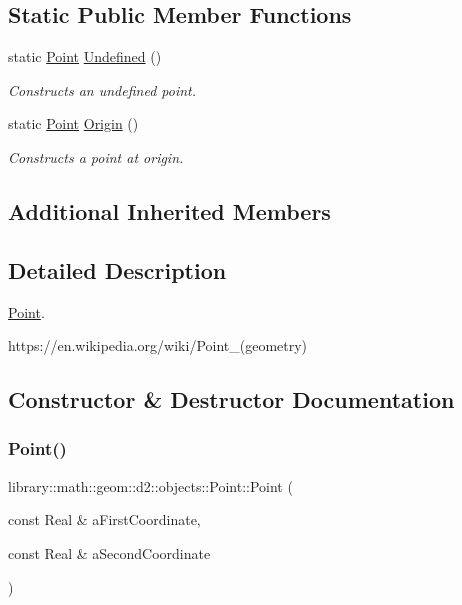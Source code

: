 \subsection*{Static Public Member Functions}
\begin{DoxyCompactItemize}
\item 
static \hyperlink{classlibrary_1_1math_1_1geom_1_1d2_1_1objects_1_1_point}{Point} \hyperlink{classlibrary_1_1math_1_1geom_1_1d2_1_1objects_1_1_point_a110a5bba9399abc5408f6c34306040c6}{Undefined} ()
\begin{DoxyCompactList}\small\item\em Constructs an undefined point. \end{DoxyCompactList}\item 
static \hyperlink{classlibrary_1_1math_1_1geom_1_1d2_1_1objects_1_1_point}{Point} \hyperlink{classlibrary_1_1math_1_1geom_1_1d2_1_1objects_1_1_point_ac372ec5b87ab91d58dc515eda2f0fa75}{Origin} ()
\begin{DoxyCompactList}\small\item\em Constructs a point at origin. \end{DoxyCompactList}\end{DoxyCompactItemize}
\subsection*{Additional Inherited Members}


\subsection{Detailed Description}
\hyperlink{classlibrary_1_1math_1_1geom_1_1d2_1_1objects_1_1_point}{Point}. 

https\+://en.wikipedia.\+org/wiki/\+Point\+\_\+(geometry) 

\subsection{Constructor \& Destructor Documentation}
\mbox{\label{classlibrary_1_1math_1_1geom_1_1d2_1_1objects_1_1_point_a4998aefdf80bdfd967f21d49fa050398}} 
\subsubsection{\texorpdfstring{Point()}{Point()}\hspace{0.1cm}{\footnotesize\ttfamily [1/2]}}
{\footnotesize\ttfamily library\+::math\+::geom\+::d2\+::objects\+::\+Point\+::\+Point (\begin{DoxyParamCaption}\item[{const Real \&}]{a\+First\+Coordinate,  }\item[{const Real \&}]{a\+Second\+Coordinate }\end{DoxyParamCaption})}



